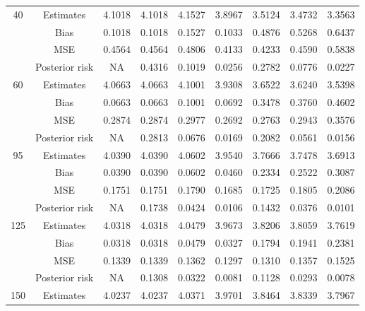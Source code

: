 \documentclass[a4paper,12pt]{report}
\begin{document}
{\begin{minipage}{\linewidth}
{\begin{tabular}{|c|c|c|c|c|c|c|c|c|}
			40		&Estimates      &4.1018 &4.1018 &4.1527 &3.8967 &3.5124 &3.4732 &3.3563 \\
			&Bias           &0.1018 &0.1018 &0.1527 &0.1033 &0.4876 &0.5268 &0.6437 \\
			&MSE            &0.4564 &0.4564 &0.4806 &0.4133 &0.4233 &0.4590 &0.5838 \\
			&Posterior risk    &NA &0.4316 &0.1019 &0.0256 &0.2782 &0.0776 &0.0227 \\\hline
			60		&Estimates      &4.0663 &4.0663 &4.1001 &3.9308 &3.6522 &3.6240 &3.5398 \\
			&Bias           &0.0663 &0.0663 &0.1001 &0.0692 &0.3478 &0.3760 &0.4602 \\
			&MSE            &0.2874 &0.2874 &0.2977 &0.2692 &0.2763 &0.2943 &0.3576 \\
			&Posterior risk    &NA &0.2813 &0.0676 &0.0169 &0.2082 &0.0561 &0.0156 \\\hline
			95		&Estimates      &4.0390 &4.0390 &4.0602 &3.9540 &3.7666 &3.7478 &3.6913 \\
			&Bias           &0.0390 &0.0390 &0.0602 &0.0460 &0.2334 &0.2522 &0.3087 \\
			&MSE            &0.1751 &0.1751 &0.1790 &0.1685 &0.1725 &0.1805 &0.2086 \\
			&Posterior risk    &NA &0.1738 &0.0424 &0.0106 &0.1432 &0.0376 &0.0101 \\\hline
			125		&Estimates      &4.0318 &4.0318 &4.0479 &3.9673 &3.8206 &3.8059 &3.7619 \\
			&Bias           &0.0318 &0.0318 &0.0479 &0.0327 &0.1794 &0.1941 &0.2381 \\
			&MSE            &0.1339 &0.1339 &0.1362 &0.1297 &0.1310 &0.1357 &0.1525 \\
			&Posterior risk    &NA &0.1308 &0.0322 &0.0081 &0.1128 &0.0293 &0.0078 \\\hline
			150		&Estimates      &4.0237 &4.0237 &4.0371 &3.9701 &3.8464 &3.8339 &3.7967 \\

\end{tabular}}
\end{minipage}}
\end{document}
